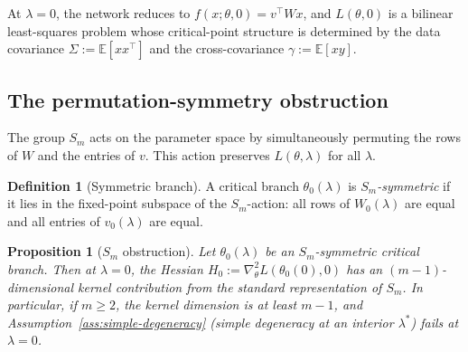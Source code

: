 \documentclass[11pt, reqno]{amsart}
\theoremstyle{plain}
\newtheorem{proposition}[theorem]{Proposition}
\theoremstyle{definition}
\newtheorem{definition}[theorem]{Definition}
\theoremstyle{remark}
\begin{document}
At $\lambda=0$, the network reduces to $f(x;\theta,0)=v^\top Wx$, and $L(\theta,0)$ is a bilinear least-squares problem whose critical-point structure is determined by the data covariance $\Sigma:=\mathbb E[xx^\top]$ and the cross-covariance $\gamma:=\mathbb E[xy]$.

\subsection{The permutation-symmetry obstruction}\label{ssec:Sm-obstruction}

The group $S_m$ acts on the parameter space by simultaneously permuting the rows of $W$ and the entries of $v$. This action preserves $L(\theta,\lambda)$ for all $\lambda$.

\begin{definition}[Symmetric branch]
A critical branch $\theta_0(\lambda)$ is \emph{$S_m$-symmetric} if it lies in the fixed-point subspace of the $S_m$-action: all rows of $W_0(\lambda)$ are equal and all entries of $v_0(\lambda)$ are equal.
\end{definition}

\begin{proposition}[$S_m$ obstruction]\label{prop:Sm-obstruction}
Let $\theta_0(\lambda)$ be an $S_m$-symmetric critical branch. Then at $\lambda=0$, the Hessian $H_0:=\nabla_\theta^2 L(\theta_0(0),0)$ has an $(m-1)$-dimensional kernel contribution from the standard representation of $S_m$. In particular, if $m\ge 2$, the kernel dimension is at least $m-1$, and Assumption~\ref{ass:simple-degeneracy} (simple degeneracy at an interior $\lambda^*$) fails at $\lambda=0$.
\end{proposition}
\end{document}
